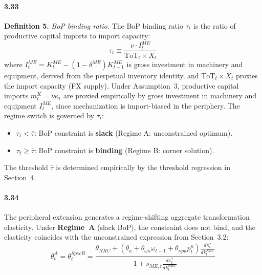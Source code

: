 \paragraph{3.33}
\textbf{Definition 5.} \textit{BoP binding ratio.} The BoP
binding ratio $\tau_t$ is the ratio of productive capital
imports to import capacity:
\begin{equation}
	\tau_t \equiv \frac{\nu \cdot I^{ME}_t}
	{\text{ToT}_t \times X_t}
	\label{eq:33:tau}
\end{equation}
where $I^{ME}_t = K^{ME}_t - (1-\delta^{ME}) K^{ME}_{t-1}$
is gross investment in machinery and equipment, derived from
the perpetual inventory identity, and $\text{ToT}_t \times X_t$
proxies the import capacity (FX supply). Under Assumption~3,
productive capital imports $m^K_t = \nu \kappa_t$ are proxied
empirically by gross investment in machinery and equipment
$I^{ME}_t$, since mechanization is import-biased in the
periphery. The regime switch is governed by $\tau_t$:
\begin{itemize}
	\item $\tau_t < \bar{\tau}$: BoP constraint is
	\textbf{slack} (Regime A: unconstrained optimum).
	\item $\tau_t \ge \bar{\tau}$: BoP constraint is
	\textbf{binding} (Regime B: corner solution).
\end{itemize}
The threshold $\bar{\tau}$ is determined empirically by the
threshold regression in Section~4.

\paragraph{3.34}
The peripheral extension generates a regime-shifting
aggregate transformation elasticity. Under \textbf{Regime~A}
(slack BoP), the constraint does not bind, and the
elasticity coincides with the unconstrained expression from
Section~3.2:
\begin{equation}
	\theta^{A}_t = \theta^{SpecB}_t
	= \frac{\theta_{NRC}
		+ \left(\theta_\kappa + \theta_{\omega\kappa}\omega_{t-1}
		+ \theta_{\kappa p\kappa} p^\kappa_t\right)
		\frac{d\kappa_t^*}{dk^{NRC}_t}}
	{1 + s_{ME,t}\frac{d\kappa_t^*}{dk^{NRC}_t}}
	\label{eq:33:theta_A}
\end{equation}

